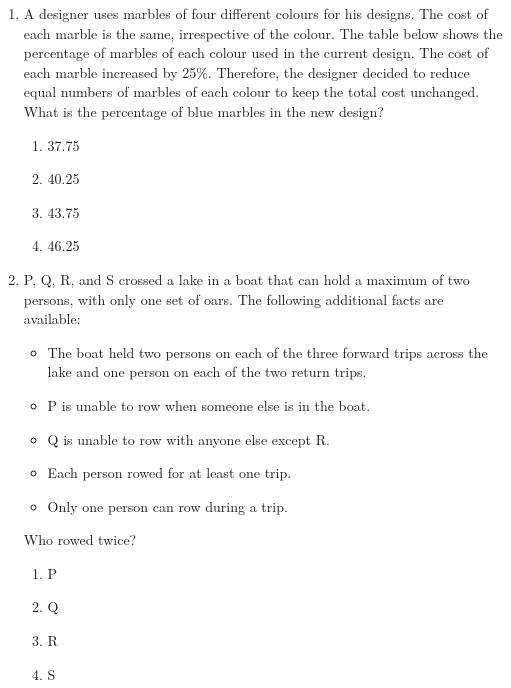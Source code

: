 \documentclass[journal,9pt,onecolumn]{IEEEtran}
\begin{document}
\begin{enumerate}
    
\item A designer uses marbles of four different colours for his designs. The cost of each marble is the same, irrespective of the colour. The table below shows the percentage of marbles of each colour used in the current design. The cost of each marble increased by 25\%. Therefore, the designer decided to reduce equal numbers of marbles of each colour to keep the total cost unchanged. What is the percentage of blue marbles in the new design?
\hfill {}
\begin{table}[]
    \centering
    
    \label{tab:EE-2018}
\end{table}
\begin{multicols}{4}
\begin{enumerate}
    \item 37.75
    \item 40.25
    \item 43.75
    \item 46.25
\end{enumerate}
\end{multicols}

\item P, Q, R, and S crossed a lake in a boat that can hold a maximum of two persons, with only one set of oars. The following additional facts are available:\hfill {}
\begin{itemize}
    \item The boat held two persons on each of the three forward trips across the lake and one person on each of the two return trips.
    \item P is unable to row when someone else is in the boat.
    \item Q is unable to row with anyone else except R.
    \item Each person rowed for at least one trip.
    \item Only one person can row during a trip.
\end{itemize}
Who rowed twice?
\begin{multicols}{4}
\begin{enumerate}
    \item P
    \item Q
    \item R
    \item S
\end{enumerate}
\end{multicols}



\end{enumerate}
\end{document}
